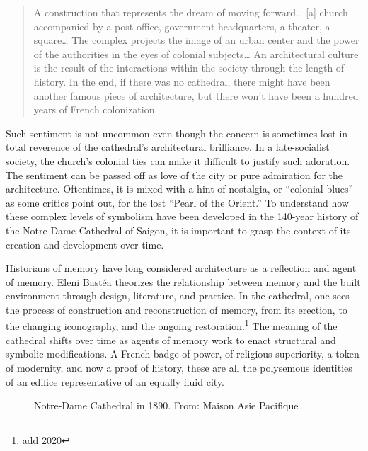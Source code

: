 \begin{quotation}
A construction that represents the dream of moving forward… [a] church accompanied by a post office, government headquarters, a theater, a square… The complex projects the image of an urban center and the power of the authorities in the eyes of colonial subjects… An architectural culture is the result of the interactions within the society through the length of history. In the end, if there was no cathedral, there might have been another famous piece of architecture, but there won’t have been a hundred years of French colonization.
\end{quotation}

Such sentiment is not uncommon even though the concern is sometimes lost in total reverence of the cathedral’s architectural brilliance. In a late-socialist society, the church’s colonial ties can make it difficult to justify such adoration. The sentiment can be passed off as love of the city or pure admiration for the architecture. Oftentimes, it is mixed with a hint of nostalgia, or “colonial blues” as some critics point out, for the lost “Pearl of the Orient.”  To understand how these complex levels of symbolism have been developed in the 140-year history of the Notre-Dame Cathedral of Saigon, it is important to grasp the context of its creation and development over time. %

Historians of memory have long considered architecture as a reflection and agent of memory. Eleni Bastéa theorizes the relationship between memory and the built environment through design, literature, and practice.  In the cathedral, one sees the process of construction and reconstruction of memory, from its erection, to the changing iconography, and the ongoing restoration.\footnote{add 2020} The meaning of the cathedral shifts over time as agents of memory work to enact structural and symbolic modifications. A French badge of power, of religious superiority, a token of modernity, and now a proof of history, these are all the polysemous identities of an edifice representative of an equally fluid city. \en

\begin{figure}[!ht]
\begin{center}
\vspace{-.2 in}
\caption[Notre-Dame Cathedral in 1890]{Notre-Dame Cathedral in 1890. From: Maison Asie Pacifique \en}\label{thienhau_present}
\end{center}
\vspace{-.2 in}
\end{figure}


